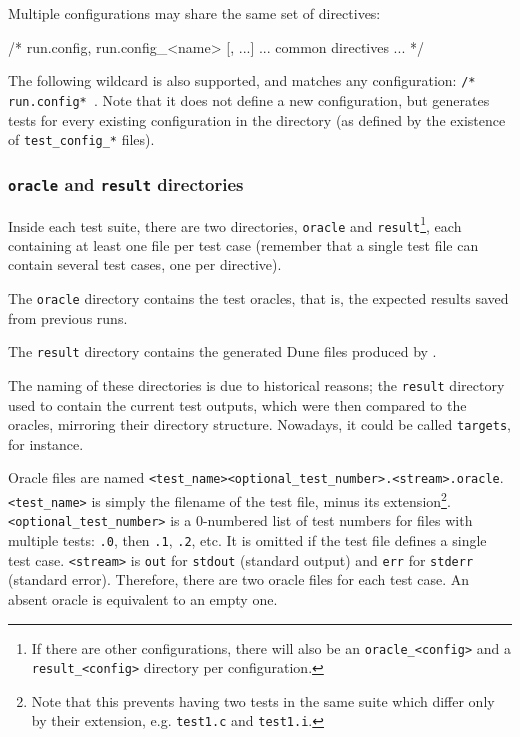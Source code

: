 Multiple configurations may share the same set of directives:
\begin{listing-nonumber}
/* run.config, run.config_<name> [, ...]
   ... common directives ...
*/
\end{listing-nonumber}
The following wildcard is also supported, and matches any
configuration: \lstinline+/* run.config* +.
Note that it does not define a new configuration, but generates tests for
every existing configuration in the directory (as defined by the existence of
\verb|test_config_*| files).

\subsubsection{\texttt{oracle} and \texttt{result} directories}\label{ptests:oracles}

Inside each test suite, there are two directories, \verb|oracle| and
\verb|result|\footnote{If there are other configurations, there will also be
an \texttt{oracle\_<config>} and a \texttt{result\_<config>} directory per
configuration.}, each containing at least one file per test case
(remember that a single test file can contain several test cases, one per
directive).

The \verb|oracle| directory contains the test oracles, that is, the expected
results saved from previous runs.

The \verb|result| directory contains the generated Dune files produced by
\ptests.

\begin{important}
  The naming of these directories is due to historical reasons; the
  \verb|result| directory used to contain the current test outputs,
  which were then compared to the oracles, mirroring their directory
  structure. Nowadays, it could be called \verb|targets|, for instance.
\end{important}

Oracle files are named \verb|<test_name><optional_test_number>.<stream>.oracle|.
\verb|<test_name>| is simply the filename of the test file, minus its
extension\footnote{Note that this prevents having two tests in the same
suite which differ only by their extension, e.g. \texttt{test1.c} and
\texttt{test1.i}.}. \verb|<optional_test_number>| is a 0-numbered list of
test numbers for files with multiple tests: \verb|.0|, then \verb|.1|,
\verb|.2|, etc. It is omitted if the test file defines a single test case.
\verb|<stream>| is \verb|out| for \verb|stdout| (standard output) and
\verb|err| for \verb|stderr| (standard error). Therefore, there are two
oracle files for each test case. An absent oracle is equivalent to an empty one.

